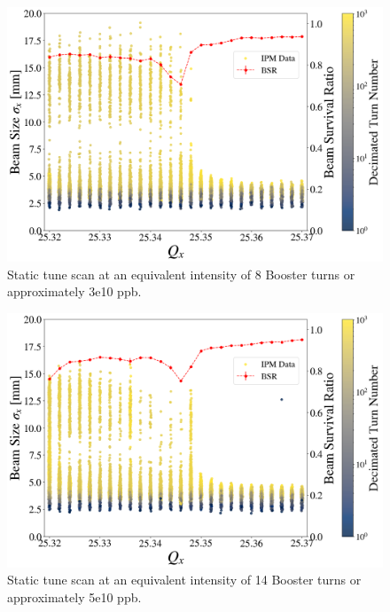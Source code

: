 \begin{figure}[H]
    \centering
    \includegraphics[width=\columnwidth]{chapter6/static8turns_dampersOFF.png}
    \caption{Static tune scan at an equivalent intensity of 8 Booster turns or approximately 3e10 ppb.}
    \label{fig:static8_scatter}
\end{figure}

\begin{figure}[H]
    \centering
    \includegraphics[width=\columnwidth]{chapter6/static14turns_dampersOFF.png}
    \caption{Static tune scan at an equivalent intensity of 14 Booster turns or approximately 5e10 ppb.}
    \label{fig:static14}
\end{figure}

